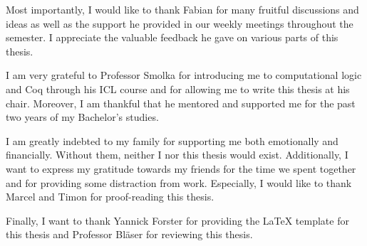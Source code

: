 Most importantly, I would like to thank Fabian for many fruitful discussions and ideas as well as the support he provided in our weekly meetings throughout the semester. I appreciate the valuable feedback he gave on various parts of this thesis. 

I am very grateful to Professor Smolka for introducing me to computational logic and Coq through his ICL course and for allowing me to write this thesis at his chair. Moreover, I am thankful that he mentored and supported me for the past two years of my Bachelor's studies. 

I am greatly indebted to my family for supporting me both emotionally and financially. Without them, neither I nor this thesis would exist. 
Additionally, I want to express my gratitude towards my friends for the time we spent together and for providing some distraction from work. Especially, I would like to thank Marcel and Timon for proof-reading this thesis. 

Finally, I want to thank Yannick Forster for providing the \LaTeX{} template for this thesis and Professor Bläser for reviewing this thesis.
